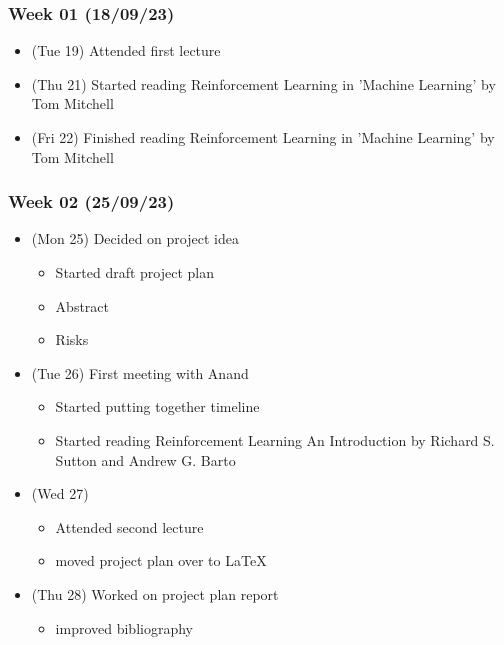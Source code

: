 \hypertarget{week-01-180923}{%
\subsubsection{Week 01 (18/09/23)}\label{week-01-180923}}

\begin{itemize}
\tightlist
\item
  (Tue 19) Attended first lecture
\item
  (Thu 21) Started reading Reinforcement Learning in 'Machine Learning'
  by Tom Mitchell
\item
  (Fri 22) Finished reading Reinforcement Learning in 'Machine Learning'
  by Tom Mitchell
\end{itemize}

\hypertarget{week-02-250923}{%
\subsubsection{Week 02 (25/09/23)}\label{week-02-250923}}

\begin{itemize}
\tightlist
\item
  (Mon 25) Decided on project idea

  \begin{itemize}
  \tightlist
  \item
    Started draft project plan
  \item
    Abstract
  \item
    Risks
  \end{itemize}
\item
  (Tue 26) First meeting with Anand

  \begin{itemize}
  \tightlist
  \item
    Started putting together timeline
  \item
    Started reading Reinforcement Learning An Introduction by Richard S.
    Sutton and Andrew G. Barto
  \end{itemize}
\item
  (Wed 27)

  \begin{itemize}
  \tightlist
  \item
    Attended second lecture
  \item
    moved project plan over to LaTeX
  \end{itemize}
\item
  (Thu 28) Worked on project plan report

  \begin{itemize}
  \tightlist
  \item
    improved bibliography
  \end{itemize}
\end{itemize}

